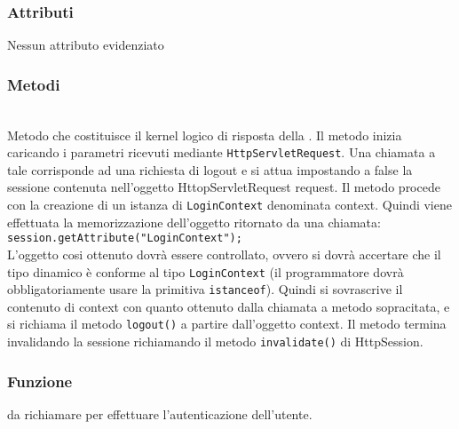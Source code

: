 \subsubsection*{Attributi}

Nessun attributo evidenziato

\subsubsection*{Metodi}
\begin{description}
	\item{}\\
	Metodo che costituisce il kernel logico di risposta della . Il metodo inizia caricando i parametri ricevuti mediante \texttt{HttpServletRequest}. Una chiamata a tale  corrisponde ad una richiesta di logout e si attua impostando a false la sessione contenuta nell'oggetto HttopServletRequest request. Il metodo procede con la creazione di un istanza  di \texttt{LoginContext} denominata context. Quindi viene effettuata la memorizzazione dell'oggetto ritornato da una chiamata:
\\
\verb|session.getAttribute("LoginContext");|
\\

L'oggetto cosi ottenuto dovrà essere controllato, ovvero si dovrà accertare che il tipo dinamico è conforme al tipo \texttt{LoginContext} (il programmatore dovrà obbligatoriamente usare   la primitiva \texttt{istanceof}). Quindi si sovrascrive il contenuto di context con quanto ottenuto dalla chiamata a metodo sopracitata, e si richiama il metodo \texttt{logout()} a partire dall'oggetto context. Il metodo termina invalidando la sessione richiamando il metodo \texttt{invalidate()} di HttpSession.

\end{description}


\subsubsection*{Funzione}
 da richiamare per effettuare l'autenticazione dell'utente.


